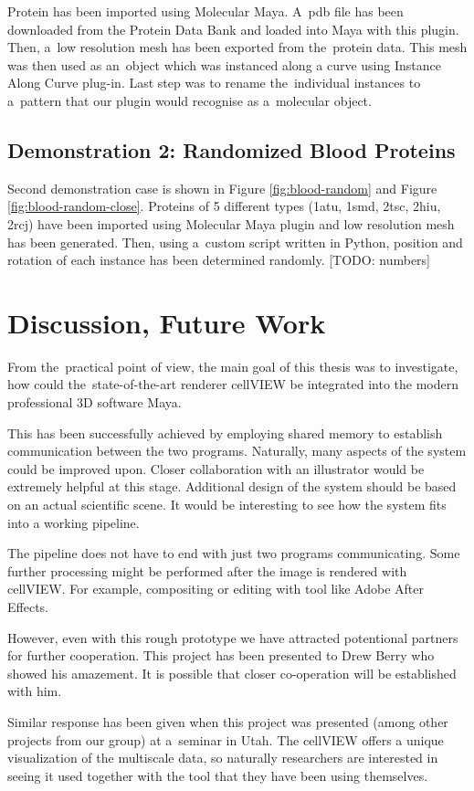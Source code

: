 \documentclass[
  digital, %
  table,   %
  nolof,     %
  nolot,     %
  oneside,
]{fithesis3}
\begin{document}
Protein has been imported using Molecular Maya. A pdb file has been downloaded from the Protein Data Bank and loaded into Maya with this plugin. Then, a low resolution mesh has been exported from the protein data. This mesh was then used as an object which was instanced along a curve using Instance Along Curve plug-in. Last step was to rename the individual instances to a pattern that our plugin would recognise as a molecular object.

\section{Demonstration 2: Randomized Blood Proteins}
Second demonstration case is shown in Figure \ref{fig:blood-random} and Figure \ref{fig:blood-random-close}. Proteins of 5 different types (1atu, 1smd, 2tsc, 2hiu, 2rcj) have been imported using Molecular Maya plugin and low resolution mesh has been generated. Then, using a custom script written in Python, position and rotation of each instance has been determined randomly.
[TODO: numbers]

\chapter{Discussion, Future Work}
\label{chap:discussion}
From the practical point of view, the main goal of this thesis was to investigate, how could the state-of-the-art renderer cellVIEW be integrated into the modern professional 3D software Maya.

This has been successfully achieved by employing shared memory to establish communication between the two programs. Naturally, many aspects of the system could be improved upon.
Closer collaboration with an illustrator would be extremely helpful at this stage. Additional design of the system should be based on an actual scientific scene. It would be interesting to see how the system fits into a working pipeline.

The pipeline does not have to end with just two programs communicating. Some further processing might be performed after the image is rendered with cellVIEW. For example, compositing or editing with tool like Adobe After Effects.

However, even with this rough prototype we have attracted potentional partners for further cooperation. This project has been presented to Drew Berry who showed his amazement. It is possible that closer co-operation will be established with him.

Similar response has been given when this project was presented (among other projects from our group) at a seminar in Utah. The cellVIEW offers a unique visualization of the multiscale data, so naturally researchers are interested in seeing it used together with the tool that they have been using themselves.
\end{document}
